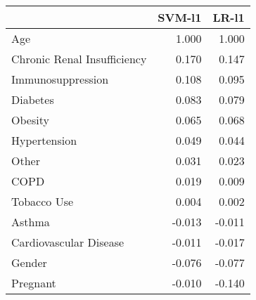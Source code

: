 \begin{tabular}{lrr}
\toprule
{} &  SVM-l1 &  LR-l1 \\
\midrule
Age                         &   1.000 &  1.000 \\
Chronic Renal Insufficiency &   0.170 &  0.147 \\
Immunosuppression           &   0.108 &  0.095 \\
Diabetes                    &   0.083 &  0.079 \\
Obesity                     &   0.065 &  0.068 \\
Hypertension                &   0.049 &  0.044 \\
Other                       &   0.031 &  0.023 \\
COPD                        &   0.019 &  0.009 \\
Tobacco Use                 &   0.004 &  0.002 \\
Asthma                      &  -0.013 & -0.011 \\
Cardiovascular Disease      &  -0.011 & -0.017 \\
Gender                      &  -0.076 & -0.077 \\
Pregnant                    &  -0.010 & -0.140 \\
\bottomrule
\end{tabular}
